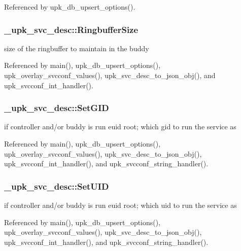 Referenced by upk\_\-db\_\-upsert\_\-options().

\subsubsection[{RingbufferSize}]{ {\bf \_\-upk\_\-svc\_\-desc::RingbufferSize}}\label{struct__upk__svc__desc_a94b3cfd4efaec9179155f1acf97c415e}
size of the ringbuffer to maintain in the buddy 

Referenced by main(), upk\_\-db\_\-upsert\_\-options(), upk\_\-overlay\_\-svcconf\_\-values(), upk\_\-svc\_\-desc\_\-to\_\-json\_\-obj(), and upk\_\-svcconf\_\-int\_\-handler().

\subsubsection[{SetGID}]{ {\bf \_\-upk\_\-svc\_\-desc::SetGID}}\label{struct__upk__svc__desc_a7887cae5324acc83464be8abac504f94}
if controller and/or buddy is run euid root; which gid to run the service as 

Referenced by main(), upk\_\-db\_\-upsert\_\-options(), upk\_\-overlay\_\-svcconf\_\-values(), upk\_\-svc\_\-desc\_\-to\_\-json\_\-obj(), upk\_\-svcconf\_\-int\_\-handler(), and upk\_\-svcconf\_\-string\_\-handler().

\subsubsection[{SetUID}]{ {\bf \_\-upk\_\-svc\_\-desc::SetUID}}\label{struct__upk__svc__desc_ace144bc7dcf20f17774b1d106e16ab21}
if controller and/or buddy is run euid root; which uid to run the service as 

Referenced by main(), upk\_\-db\_\-upsert\_\-options(), upk\_\-overlay\_\-svcconf\_\-values(), upk\_\-svc\_\-desc\_\-to\_\-json\_\-obj(), upk\_\-svcconf\_\-int\_\-handler(), and upk\_\-svcconf\_\-string\_\-handler().

